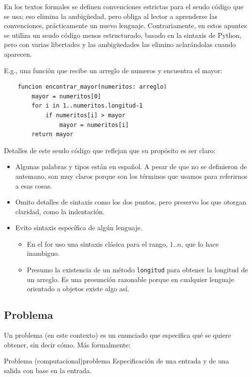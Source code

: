 En los textos formales se definen convenciones estrictas para el seudo código que se usa; eso elimina la ambigüedad, pero obliga al lector a aprenderse las convenciones, prácticamente un nuevo lenguaje. Contrariamente, en estos apuntes se utiliza un seudo código menos estructurado, basado en la sintaxis de Python, pero con varias libertades y las ambigüedades las elimino aclarándolas cuando aparecen.

E.g., una función que recibe un arreglo de numeros y encuentra el mayor:
\begin{verbatim}
    funcion encontrar_mayor(numeritos: arreglo)
        mayor = numeritos[0]
        for i in 1..numeritos.longitud-1
            if numeritos[i] > mayor
                mayor = numeritos[i]
        return mayor
\end{verbatim}
Detalles de este seudo código que reflejan que su propósito es ser claro:
\begin{itemize}
  \item Algunas palabras y tipos están en español. A pesar de que no se definieron de antemano, son muy claros porque son los términos que usamos para referirnos a esas cosas.
  \item Omito detalles de sintaxis como los dos puntos, pero preservo los que otorgan claridad, como la indentación.
  \item Evito sintaxis específica de algún lenguaje.
  \begin{itemize}
    \item En el for uso una sintaxis clásica para el rango, $1..n$, que lo hace inambiguo.
    \item Presumo la existencia de un método \texttt{longitud} para obtener la longitud de un arreglo. Es una presunción razonable porque en cualquier lenguaje orientado a objetos existe algo así.
  \end{itemize}
\end{itemize}

\subsection{Problema}

Un problema (en este contexto) es un enunciado que especifica qué se quiere obtener, sin decir cómo. Más formalmente:
\begin{definicion}{Problema (computacional)}{problema}
Especificación de una entrada y de una salida con base en la entrada.
\end{definicion}

